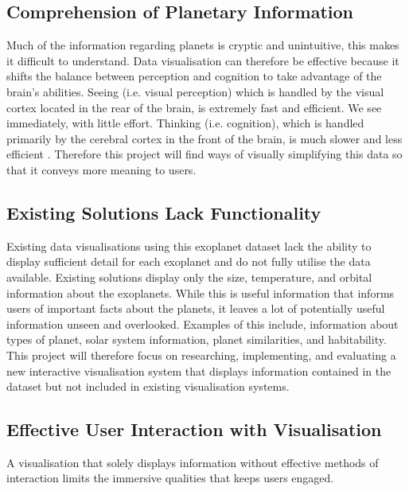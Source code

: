 \subsection{Comprehension of Planetary Information}
Much of the information regarding planets is cryptic and unintuitive, this makes
it difficult to understand. Data visualisation can therefore be effective
because it shifts the balance between perception and cognition to take advantage
of
the brain's abilities. Seeing (i.e. visual perception) which is handled by the
visual cortex located in the rear of the brain, is extremely fast and efficient.
We see immediately, with little effort. Thinking (i.e. cognition), which is
handled primarily by the cerebral cortex in the front of the brain, is much
slower and less efficient \cite{few}. Therefore this project will find ways of
visually simplifying this data so that it conveys more meaning to users. 


\subsection{Existing Solutions Lack Functionality}
Existing data visualisations using this exoplanet dataset lack the
ability to display sufficient detail for each exoplanet and do not fully utilise
the data available. Existing solutions display only the size, temperature,
and orbital information about the exoplanets. While this is useful information
that informs users of important facts about the planets, it leaves a lot of
potentially useful information unseen and overlooked. 
Examples of this include, information about types of planet, solar system information,
planet similarities, and habitability. This project will therefore focus on
researching, implementing, and evaluating a new interactive visualisation system
that displays information contained in the dataset but not
included in existing visualisation systems.

\subsection{Effective User Interaction with Visualisation}
A visualisation that solely displays information without effective methods of
interaction limits the immersive qualities that keeps users engaged.

